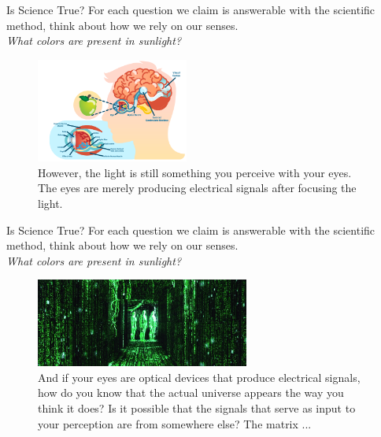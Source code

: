 \documentclass{beamer}
\begin{document}
\begin{frame}{Is Science True?}
For each question we claim is answerable with the scientific method, think about how we rely on our senses. \\ \vspace{0.5cm}
\textit{What colors are present in sunlight?}
\begin{figure}
\centering
\includegraphics[width=5cm]{figures/eye.png}
\caption{However, the light is still something you perceive with your eyes.  The eyes are merely producing electrical signals after focusing the light.}
\end{figure}
\end{frame}

\begin{frame}{Is Science True?}
For each question we claim is answerable with the scientific method, think about how we rely on our senses. \\ \vspace{0.5cm}
\textit{What colors are present in sunlight?}
\begin{figure}
\centering
\includegraphics[width=7cm]{figures/matrix.jpg}
\caption{And if your eyes are optical devices that produce electrical signals, how do you know that the actual universe appears the way you think it does?  Is it possible that the signals that serve as input to your perception are from somewhere else? The matrix ...}
\end{figure}
\end{frame}
\end{document}
